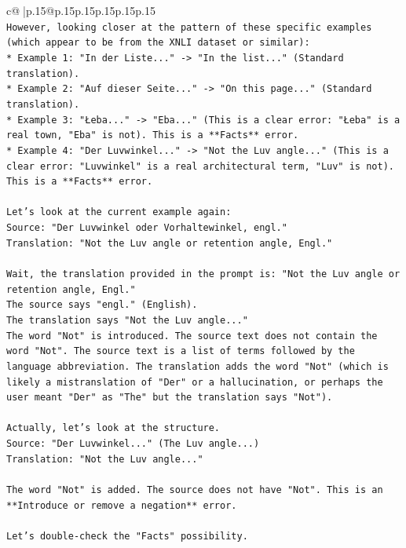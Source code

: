 \documentclass{article}
\begin{document}
{\begin{supertabular}{c@{$\;$}|p{.15\linewidth}@{}p{.15\linewidth}p{.15\linewidth}p{.15\linewidth}p{.15\linewidth}p{.15\linewidth}}
{{{\\ 
\texttt{However, looking closer at the pattern of these specific examples (which appear to be from the XNLI dataset or similar):} \\
\texttt{*   Example 1: "In der Liste..." {-}> "In the list..." (Standard translation).} \\
\texttt{*   Example 2: "Auf dieser Seite..." {-}> "On this page..." (Standard translation).} \\
\texttt{*   Example 3: "Łeba..." {-}> "Eba..." (This is a clear error: "Łeba" is a real town, "Eba" is not). This is a **Facts** error.} \\
\texttt{*   Example 4: "Der Luvwinkel..." {-}> "Not the Luv angle..." (This is a clear error: "Luvwinkel" is a real architectural term, "Luv" is not). This is a **Facts** error.} \\
\\ 
\texttt{Let's look at the current example again:} \\
\texttt{Source: "Der Luvwinkel oder Vorhaltewinkel, engl."} \\
\texttt{Translation: "Not the Luv angle or retention angle, Engl."} \\
\\ 
\texttt{Wait, the translation provided in the prompt is: "Not the Luv angle or retention angle, Engl."} \\
\texttt{The source says "engl." (English).} \\
\texttt{The translation says "Not the Luv angle..."} \\
\texttt{The word "Not" is introduced. The source text does not contain the word "Not". The source text is a list of terms followed by the language abbreviation. The translation adds the word "Not" (which is likely a mistranslation of "Der" or a hallucination, or perhaps the user meant "Der" as "The" but the translation says "Not").} \\
\\ 
\texttt{Actually, let's look at the structure.} \\
\texttt{Source: "Der Luvwinkel..." (The Luv angle...)} \\
\texttt{Translation: "Not the Luv angle..."} \\
\\ 
\texttt{The word "Not" is added. The source does not have "Not". This is an **Introduce or remove a negation** error.} \\
\\ 
\texttt{Let's double{-}check the "Facts" possibility.} \\
}}}
\end{supertabular}}
\end{document}
